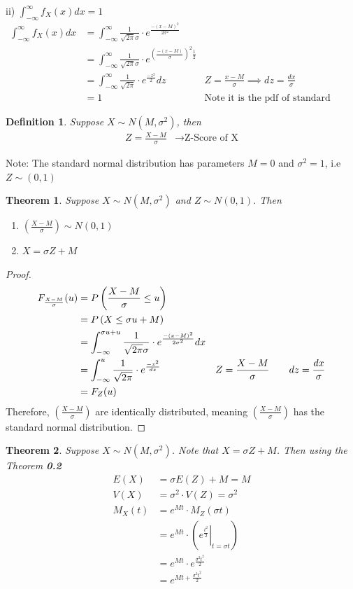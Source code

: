 \documentclass[11pt,oneside]{book}
\theoremstyle{break}
\theoremstyle{break}
\newtheorem{thm}{Theorem}[section]
\newtheorem{defn}{Definition}[corL]
\newcommand{\note}{\color{Purple}Note: \color{black}}
\begin{document}
ii) $\int_{-\infty}^{\infty}f_X(x)dx=1$\\
\begin{align*}
\int_{-\infty}^{\infty}f_X(x)dx&=\int_{-\infty}^{\infty}\frac{1}{\sqrt{2\pi}\sigma}\cdot e^{\frac{-(x-M)^2}{2\sigma^2}}\\
&=\int_{-\infty}^{\infty}\frac{1}{\sqrt{2\pi}\sigma}\cdot e^{\left(\frac{-(x-M)}{\sigma}\right)^2\frac{1}{2}}\\
&=\int_{-\infty}^{\infty}\frac{1}{\sqrt{2\pi}}\cdot e^{\frac{-z^2}{2}}dz&Z=\frac{x-M}{\sigma}\implies dz=\frac{dx}{\sigma}\\
&=1&\text{Note it is the pdf of standard normal distribution}
\end{align*}
\begin{defn}
Suppose $X\sim N(M,\sigma^2)$, then \begin{align*}
Z=\frac{X-M}{\sigma}&\longrightarrow \text{Z-Score of X}
\end{align*}
\end{defn}
\note The standard normal distribution has parameters $M=0$ and $\sigma^2=1$, i.e $Z\sim (0,1)$\\
\begin{thm}
Suppose $X\sim N(M,\sigma^2)$ and $Z\sim N(0,1)$. Then \begin{enumerate}
\item $\left( \frac{X-M}{\sigma}\right)\sim N(0,1)$
\item $X=\sigma Z +M$
\end{enumerate}
\end{thm}

\begin{proof}
\begin{align*}
F_{\frac{X-M}{\sigma}}(u)&=P\left( \frac{X-M}{\sigma}\leq u\right)\\
&=P\left( X\leq \sigma u +M\right)\\
&=\int_{-\infty}^{\sigma u +u}\frac{1}{\sqrt{2\pi}\sigma}\cdot e^{\frac{-(x-M)^2}{2\sigma^2}}dx\\
&=\int_{-\infty}^{u}\frac{1}{\sqrt{2\pi}}\cdot e^{\frac{-z^2}{dz}}&Z=\frac{X-M}{\sigma}\text{\qquad}dz=\frac{dx}{\sigma}\\
&=F_Z(u)
\end{align*}
Therefore, $\left(\frac{X-M}{\sigma}\right)$ are identically distributed, meaning $\left(\frac{X-M}{\sigma}\right)$  has the standard normal distribution.
\end{proof}
\begin{thm}
Suppose $X\sim N(M,\sigma^2)$. Note that $X=\sigma Z+M$. Then using the Theorem \textbf{0.2}\begin{align*}
E(X)&=\sigma E(Z)+M=M\\
V(X)&=\sigma^2\cdot V(Z)=\sigma^2\\
M_X(t)&=e^{Mt}\cdot M_Z(\sigma t)\\
&=e^{Mt}\cdot \left( \left. e^{\frac{t^2}{2}}\right|_{t=\sigma t}\right)\\
&=e^{Mt}\cdot e^{\frac{\sigma^2t^2}{2}}\\
&=e^{Mt+\frac{\sigma^2t^2}{2}}
\end{align*}
\end{thm}
\end{document}

